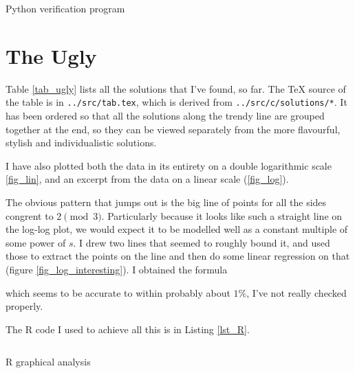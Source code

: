 \begin{longlisting}
\inputminted{python}{../src/factcheck.py}
\caption{Python verification program}
\label{lst_py_verif}
\end{longlisting}

\section{The Ugly}

Table \ref{tab_ugly} lists all the solutions that I've found, so far. The
\TeX{} source of the table is in \texttt{../src/tab.tex}, which is derived from
\texttt{../src/c/solutions/*}. It has been ordered so that all the solutions
along the trendy line are grouped together at the end, so they can be viewed
separately from the more flavourful, stylish and individualistic solutions.

I have also plotted both the data in its entirety on a double logarithmic scale
\ref{fig_lin}, and an excerpt from the data on a linear scale (\ref{fig_log}).

The obvious pattern that jumps out is the big line of points for all the sides
congrent to \(2 \pmod 3\). Particularly because it looks like such a straight
line on the log-log plot, we would expect it to be modelled well as a constant
multiple of some power of \(s\). I drew two lines that seemed to roughly bound
it, and used those to extract the points on the line and then do some linear
regression on that (figure \ref{fig_log_interesting}). I obtained the formula

which seems to be accurate to within probably about \(1\%\), I've not really
checked properly.

The R code I used to achieve all this is in Listing \ref{lst_R}.

\begin{longlisting}
\inputminted{R}{../graph/graph.R}
\caption{R graphical analysis}
\label{lst_R}
\end{longlisting}

